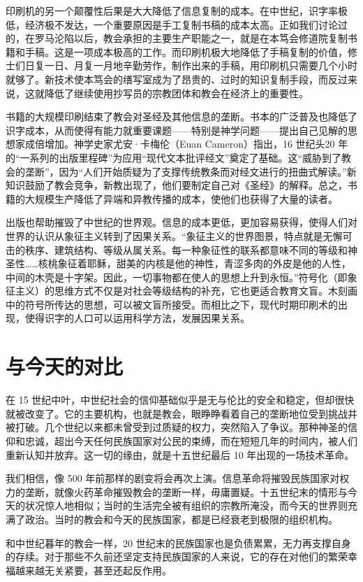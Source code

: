 印刷机的另一个颠覆性后果是大大降低了信息复制的成本。在中世纪，识字率极低，经济极不发达，一个重要原因是手工复制书稿的成本太高。正如我们讨论过的，在罗马沦陷以后，教会承担的主要生产职能之一，就是在本笃会修道院复制书籍和手稿。这是一项成本极高的工作。而印刷机极大地降低了手稿复制的价值，修士们日复一日、月复一月地辛勤劳作，制作出来的手稿，用印刷机只需要几个小时就够了。新技术使本笃会的缮写室成为了昂贵的、过时的知识复制手段，而反过来说，这就降低了继续使用抄写员的宗教团体和教会在经济上的重要性。

书籍的大规模印刷结束了教会对圣经及其他信息的垄断。书本的广泛普及也降低了识字成本，从而使得有能力就重要课题——特别是神学问题——提出自己见解的思想家成倍增加。神学史家尤安·卡梅伦（Euan Cameron）指出，16 世纪头20 年的“一系列的出版里程碑”为应用“现代文本批评经文”奠定了基础。这“威胁到了教会的垄断”，因为“人们开始质疑为了支撑传统教条而对经文进行的扭曲式解读。”新知识鼓励了教会竞争，新教出现了，他们要制定自己对《圣经》的解释。总之，书籍的大规模生产降低了异端和异教传播的成本，使他们也获得了大量的读者。

出版也帮助摧毁了中世纪的世界观。信息的成本更低，更加容易获得，使得人们对世界的认识从象征主义转到了因果关系。“象征主义的世界图景，特点就是无懈可击的秩序、建筑结构、等级从属关系。每一种象征性的联系都意味不同的等级和神圣性……核桃象征着耶稣，甜美的内核是他的神性，青涩多肉的外皮是他的人性，中间的木壳是十字架。因此，一切事物都在使人的思想上升到永恒。”符号化（即象征主义）的思维方式不仅是对社会等级结构的补充，它也更适合教育文盲。木刻画中的符号所传达的思想，可以被文盲所接受。而相比之下，现代时期印刷术的出现，使得识字的人口可以运用科学方法，发展因果关系。

\section{与今天的对比}
在 15 世纪中叶，中世纪社会的信仰基础似乎是无与伦比的安全和稳定，但却很快就被改变了。它的主要机构，也就是教会，眼睁睁看着自己的垄断地位受到挑战并被打破。几个世纪以来都未曾受到过质疑的权力，突然陷入了争议。那种神圣的信仰和忠诚，超出今天任何民族国家对公民的束缚，而在短短几年的时间内，被人们重新认知并放弃。这一切的缘由，就是十五世纪最后 10 年出现的一场技术革命。

我们相信，像 500 年前那样的剧变将会再次上演。信息革命将摧毁民族国家对权力的垄断，就像火药革命摧毁教会的垄断一样，毋庸置疑。十五世纪末的情形与今天的状况惊人地相似；当时的生活完全被有组织的宗教所淹没，而今天的世界则充满了政治。当时的教会和今天的民族国家，都是已经衰老到极限的组织机构。

和中世纪暮年的教会一样，20 世纪末的民族国家也是负债累累，无力再支撑自身的存续。对于那些不久前还坚定支持民族国家的人来说，它的存在对他们的繁荣幸福越来越无关紧要，甚至还起反作用。

